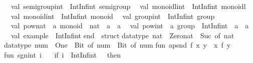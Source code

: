 \begin{isabellebody}
\begin{isamarkuptext}
\ \ val\ semigroup{}int\ {}\ IntInf{}int\ semigroup\isanewline
\ \ val\ monoidl{}int\ {}\ IntInf{}int\ monoidl\isanewline
\ \ val\ monoid{}int\ {}\ IntInf{}int\ monoid\isanewline
\ \ val\ group{}int\ {}\ IntInf{}int\ group\isanewline
\ \ val\ pow{}nat\ {}\ {}a\ monoid\ {}{}\ nat\ {}{}\ {}a\ {}{}\ {}a\isanewline
\ \ val\ pow{}int\ {}\ {}a\ group\ {}{}\ IntInf{}int\ {}{}\ {}a\ {}{}\ {}a\isanewline
\ \ val\ example\ {}\ IntInf{}int\isanewline
end\ {}\ struct\isanewline
\isanewline
datatype\ nat\ {}\ Zero{}nat\ {}\ Suc\ of\ nat{}\isanewline
\isanewline
datatype\ num\ {}\ One\ {}\ Bit{}\ of\ num\ {}\ Bit{}\ of\ num{}\isanewline
\isanewline
fun\ apsnd\ f\ {}x{}\ y{}\ {}\ {}x{}\ f\ y{}{}\isanewline
\isanewline
fun\ sgn{}int\ i\ {}\isanewline
\ \ {}if\ {}{}i\ {}\ IntInf{}int{}\ {}\ {}{}\ then\ {}\isanewline

\end{isamarkuptext}
\end{isabellebody}
